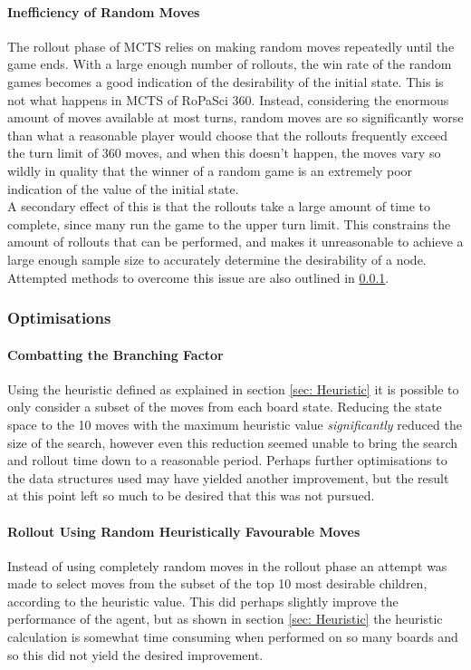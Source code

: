 \documentclass{article}
\begin{document}
\paragraph{Inefficiency of Random Moves}
The rollout phase of MCTS relies on making random moves repeatedly until the game ends. With a large enough number of rollouts, the win rate of the random games becomes a good indication of the desirability of the initial state. This is not what happens in MCTS of RoPaSci 360. Instead, considering the enormous amount of moves available at most turns, random moves are so significantly worse than what a reasonable player would choose that the rollouts frequently exceed the turn limit of 360 moves, and when this doesn't happen, the moves vary so wildly in quality that the winner of a random game is an extremely poor indication of the value of the initial state.\\[2mm]
A secondary effect of this is that the rollouts take a large amount of time to complete, since many run the game to the upper turn limit. This constrains the amount of rollouts that can be performed, and makes it unreasonable to achieve a large enough sample size to accurately determine the desirability of a node. Attempted methods to overcome this issue are also outlined in \ref{sec: MCTS Optimisations}.

\subsubsection{Optimisations}
\label{sec: MCTS Optimisations}
\paragraph{Combatting the Branching Factor}
Using the heuristic defined as explained in section \ref{sec: Heuristic} it is possible to only consider a subset of the moves from each board state. Reducing the state space to the 10 moves with the maximum heuristic value \textit{significantly} reduced the size of the search, however even this reduction seemed unable to bring the search and rollout time down to a reasonable period. Perhaps further optimisations to the data structures used may have yielded another improvement, but the result at this point left so much to be desired that this was not pursued.
\paragraph{Rollout Using Random Heuristically Favourable Moves}
Instead of using completely random moves in the rollout phase an attempt was made to select moves from the subset of the top 10 most desirable children, according to the heuristic value. This did perhaps slightly improve the performance of the agent, but as shown in section \ref{sec: Heuristic} the heuristic calculation is somewhat time consuming when performed on so many boards and so this did not yield the desired improvement.
\end{document}
